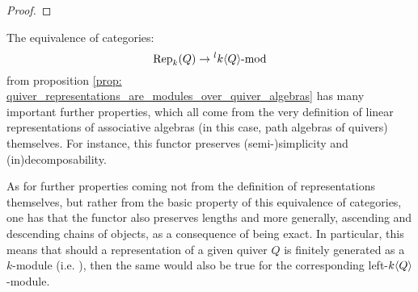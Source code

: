                 \begin{proof}
                    
                \end{proof}
            \begin{remark}
                The equivalence of categories:
                    $$\mathrm{Rep}_{k}(Q) \to {}^lk\langle Q\rangle\text{-}\mathrm{mod}$$
                from proposition \ref{prop: quiver_representations_are_modules_over_quiver_algebras} has many important further properties, which all come from the very definition of linear representations of associative algebras (in this case, path algebras of quivers) themselves. For instance, this functor preserves (semi-)simplicity and (in)decomposability.
                
                As for further properties coming not from the definition of representations themselves, but rather from the basic property of this equivalence of categories, one has that the functor also preserves lengths and more generally, ascending and descending chains of objects, as a consequence of being exact. In particular, this means that should a representation of a given quiver $Q$ is finitely generated as a $k$-module (i.e. ), then the same would also be true for the corresponding left-$k\langle Q\rangle$-module.
            \end{remark}
                

